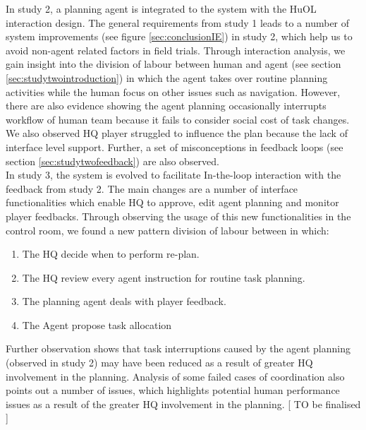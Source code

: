 In study 2, a planning agent is integrated to the system with the HuOL interaction design. The general requirements from study 1 leads to a number of system improvements (see figure \ref{sec:conclusionIE}) in study 2, which help us to avoid non-agent related factors in field trials. Through interaction analysis, we gain insight into the division of labour between human and agent (see section \ref{sec:studytwointroduction}) in which the agent takes over routine planning activities while the human focus on other issues such as navigation. However, there are also evidence showing the agent planning occasionally interrupts workflow of human team because it fails to consider social cost of task changes. We also observed HQ player struggled to influence the plan because the lack of interface level support. Further, a set of misconceptions in feedback loops (see section \ref{sec:studytwofeedback}) are also observed.\\

In study 3, the system is evolved to facilitate In-the-loop interaction with the feedback from study 2. The main changes are a number of interface functionalities which enable HQ to approve, edit agent planning and monitor player feedbacks. Through observing the usage of this new functionalities in the control room, we found a new pattern division of labour between in which:
	\begin{enumerate}
	 \item The HQ decide when to perform re-plan.
	 \item The HQ review every agent instruction for routine task planning.
	 \item The planning agent deals with player feedback.
	 \item The Agent propose task allocation
	\end{enumerate}
	
Further observation shows that task interruptions caused by the agent planning (observed in study 2) may have been reduced as a result of greater HQ involvement in the planning. Analysis of some failed cases of coordination also points out a number of issues, which highlights potential human performance issues as a result of the greater HQ involvement in the planning. [ TO be finalised ]  \\

